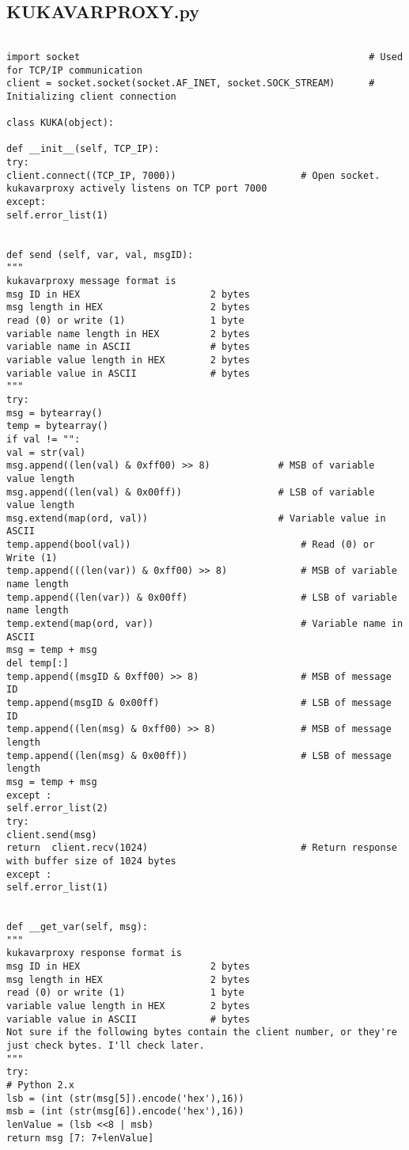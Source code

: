 \subsection{KUKAVARPROXY.py}
\begin{lstlisting}[language=terCmd]

import socket                                                   # Used for TCP/IP communication
client = socket.socket(socket.AF_INET, socket.SOCK_STREAM)		# Initializing client connection

class KUKA(object):

def __init__(self, TCP_IP):
try: 
client.connect((TCP_IP, 7000))                      # Open socket. kukavarproxy actively listens on TCP port 7000
except: 
self.error_list(1)


def send (self, var, val, msgID):
"""
kukavarproxy message format is 
msg ID in HEX                       2 bytes
msg length in HEX                   2 bytes
read (0) or write (1)               1 byte
variable name length in HEX         2 bytes
variable name in ASCII              # bytes
variable value length in HEX        2 bytes
variable value in ASCII             # bytes
"""
try:
msg = bytearray()
temp = bytearray()
if val != "":
val = str(val)
msg.append((len(val) & 0xff00) >> 8)            # MSB of variable value length
msg.append((len(val) & 0x00ff))                 # LSB of variable value length
msg.extend(map(ord, val))                       # Variable value in ASCII
temp.append(bool(val))                              # Read (0) or Write (1)
temp.append(((len(var)) & 0xff00) >> 8)             # MSB of variable name length
temp.append((len(var)) & 0x00ff)                    # LSB of variable name length
temp.extend(map(ord, var))                          # Variable name in ASCII 
msg = temp + msg
del temp[:]
temp.append((msgID & 0xff00) >> 8)                  # MSB of message ID
temp.append(msgID & 0x00ff)                         # LSB of message ID
temp.append((len(msg) & 0xff00) >> 8)               # MSB of message length
temp.append((len(msg) & 0x00ff))                    # LSB of message length
msg = temp + msg
except :
self.error_list(2)
try:
client.send(msg)
return  client.recv(1024)                           # Return response with buffer size of 1024 bytes
except :
self.error_list(1)


def __get_var(self, msg):
"""
kukavarproxy response format is 
msg ID in HEX                       2 bytes
msg length in HEX                   2 bytes
read (0) or write (1)               1 byte
variable value length in HEX        2 bytes
variable value in ASCII             # bytes
Not sure if the following bytes contain the client number, or they're just check bytes. I'll check later.
"""
try:
# Python 2.x
lsb = (int (str(msg[5]).encode('hex'),16))
msb = (int (str(msg[6]).encode('hex'),16))
lenValue = (lsb <<8 | msb)
return msg [7: 7+lenValue]


\end{lstlisting}
